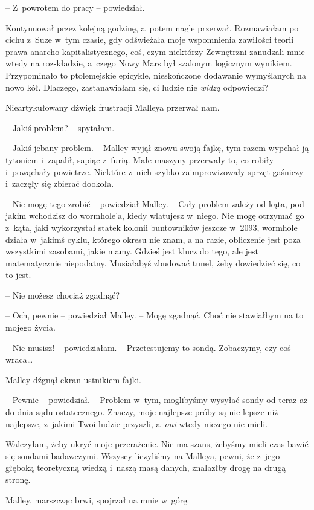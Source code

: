 \documentclass[oneside,polish,11pt,sfheadings]{mwbk}
\begin{document}
-- Z~powrotem do pracy -- powiedział.

Kontynuował przez kolejną godzinę, a~potem nagle przerwał. Rozmawiałam
po cichu z~Suze w~tym czasie, gdy odświeżała moje wspomnienia zawiłości
teorii prawa anarcho-kapitalistycznego, coś, czym niektórzy Zewnętrzni
zanudzali mnie wtedy na roz-kładzie, a~czego Nowy Mars był szalonym
logicznym wynikiem. Przypominało to ptolemejskie epicykle, nieskończone
dodawanie wymyślanych na nowo kół. Dlaczego, zastanawiałam się, ci
ludzie nie \textit{widzą} odpowiedzi?

Nieartykułowany dźwięk frustracji Malleya przerwał nam.

-- Jakiś problem? -- spytałam.

-- Jakiś jebany problem. -- Malley wyjął znowu swoją fajkę, tym razem
wypchał ją tytoniem i~zapalił, sapiąc z~furią. Małe maszyny przerwały
to, co robiły i~powąchały powietrze. Niektóre z~nich szybko
zaimprowizowały sprzęt gaśniczy i~zaczęły się zbierać dookoła.

-- Nie mogę tego zrobić -- powiedział Malley. -- Cały problem zależy od
kąta, pod jakim wchodzisz do wormhole'a, kiedy wlatujesz w~niego. Nie
mogę otrzymać go z~kąta, jaki wykorzystał statek kolonii buntowników
jeszcze w~2093, wormhole działa w~jakimś cyklu, którego okresu nie znam,
a na razie, obliczenie jest poza wszystkimi zasobami, jakie mamy. Gdzieś
jest klucz do tego, ale jest matematycznie niepodatny. Musiałabyś
zbudować tunel, żeby dowiedzieć się, co to jest.

-- Nie możesz chociaż zgadnąć?

-- Och, pewnie -- powiedział Malley. -- Mogę zgadnąć. Choć nie stawiałbym
na to mojego życia.

-- Nie musisz! -- powiedziałam. -- Przetestujemy to sondą. Zobaczymy, czy
coś wraca\ldots 

Malley dźgnął ekran ustnikiem fajki. 

-- Pewnie -- powiedział. -- Problem w~tym, moglibyśmy wysyłać sondy od teraz aż do dnia sądu ostatecznego.
Znaczy, moje najlepsze próby są nie lepsze niż najlepsze, z~jakimi Twoi
ludzie przyszli, a~\textit{oni} wtedy niczego nie mieli.

Walczyłam, żeby ukryć moje przerażenie. Nie ma szans, żebyśmy mieli czas
bawić się sondami badawczymi. Wszyscy liczyliśmy na Malleya, pewni, że z~jego głęboką teoretyczną wiedzą i~naszą masą danych, znalazłby drogę na
drugą stronę.

Malley, marszcząc brwi, spojrzał na mnie w~górę.
\end{document}
